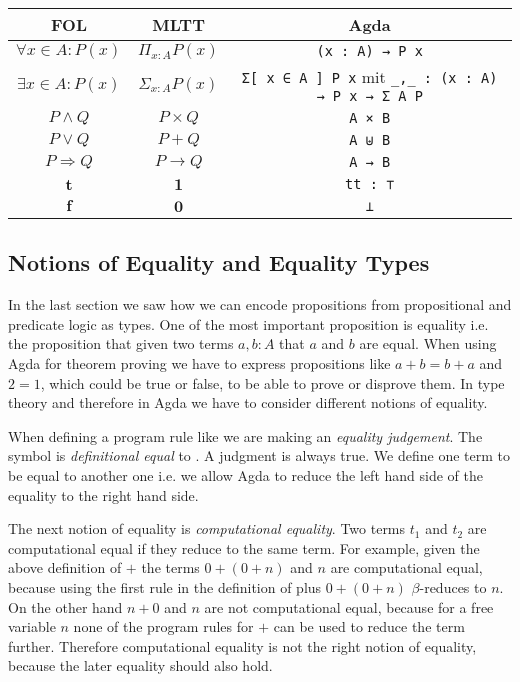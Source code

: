 \documentclass[10pt,a4paper,twoside]{report}
\begin{document}
\begin{center}
  \begin{tabular}{ccc}
    FOL & MLTT & Agda \\\hline
    $\forall x \in A: P(x)$ & $\Pi_{x:A}P(x)$ & \texttt{(x : A) → P x} \\
    $\exists x \in A: P(x)$ & $\Sigma_{x:A} P(x)$ & \texttt{Σ[ x ∈ A ] P x} mit \texttt{_,_ : (x : A) → P x → Σ A P} \\
    $P \wedge Q$ & $P \times Q$ & \texttt{A × B} \\
    $P \vee Q$ & $P + Q$ & \texttt{A ⊎ B} \\
    $P \Rightarrow Q$ & $P \rightarrow Q$ & \texttt{A → B} \\
    $\mathbf t$ & $\mathbf 1$ & \texttt{tt : ⊤} \\
    $\mathbf f$ & $\mathbf 0$ & \texttt{⊥}
  \end{tabular}
\end{center}

\subsection{Notions of Equality and Equality Types}

In the last section we saw how we can encode propositions from propositional and
predicate logic as types.
One of the most important proposition is equality i.e. the proposition that
given two terms $a, b : A$ that $a$ and $b$ are equal.
When using Agda for theorem proving we have to express propositions like $a + b
= b + a$ and $2 = 1$, which could be true or false, to be able to prove or
disprove them.
In type theory and therefore in Agda we have to consider different notions of
equality.

When defining a program rule like
\AgdaSpace{}\AgdaSymbol{=}\AgdaSpace{}
we are making an \textit{equality judgement}.
The symbol  is \textit{definitional equal} to .
A judgment is always true.
We define one term to be equal to another one i.e. we allow Agda to reduce the
left hand side of the equality to the right hand side.

The next notion of equality is \textit{computational equality}.
Two terms $t_1$ and $t_2$ are computational equal if they reduce to the same
term.
For example, given the above definition of $+$ the terms $0+(0+n)$ and $n$ are
computational equal, because using the first rule in the definition of plus
$0+(0+n)$ $\beta$-reduces to $n$.
On the other hand $n+0$ and $n$ are not computational equal, because for a free
variable $n$ none of the program rules for $+$ can be used to reduce the term
further.
Therefore computational equality is not the right notion of equality, because
the later equality should also hold.
\end{document}
